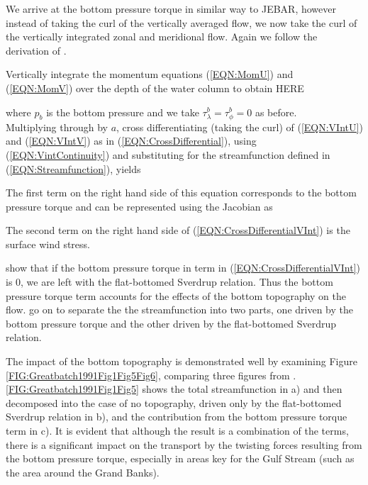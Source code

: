\documentclass[..\EOYR.tex]{subfiles}
\begin{document}
We arrive at the bottom pressure torque in similar way to JEBAR, however instead of taking the curl of the vertically averaged flow, we now take the curl of the vertically integrated zonal and meridional flow.
Again we follow the derivation of \citep{Greatbatch1991}.

Vertically integrate the momentum equations (\ref{EQN:MomU}) and (\ref{EQN:MomV}) over the depth of the water column to obtain HERE


where $p_b$ is the bottom pressure and we take $\tau_\lambda^b=\tau_\phi^b=0$ as before.\\
Multiplying through by $a$, cross differentiating (taking the curl) of (\ref{EQN:VIntU}) and (\ref{EQN:VIntV}) as in (\ref{EQN:CrossDifferential}), using (\ref{EQN:VintContinuity}) and substituting for the streamfunction defined in (\ref{EQN:Streamfunction}), yields



The first term on the right hand side of this equation corresponds to the bottom pressure torque and can be represented using the Jacobian as



The second term on the right hand side of (\ref{EQN:CrossDifferentialVInt}) is the surface wind stress.

\citep{Greatbatch1991} show that if the bottom pressure torque in term in (\ref{EQN:CrossDifferentialVInt}) is 0, we are left with the flat-bottomed Sverdrup relation. Thus the bottom pressure torque term accounts for the effects of the bottom topography on the flow. \citep{Greatbatch1991} go on to separate the the streamfunction into two parts, one driven by the bottom pressure torque and the other driven by the flat-bottomed Sverdrup relation.
\par The impact of the bottom topography is demonstrated well by examining Figure \ref{FIG:Greatbatch1991Fig1Fig5Fig6}, comparing three figures from \citep{Greatbatch1991}. \ref{FIG:Greatbatch1991Fig1Fig5} shows the total streamfunction in a) and then decomposed into the case of no topography, driven only by the flat-bottomed Sverdrup relation in b), and the contribution from the bottom pressure torque term in c). It is evident that although the result is a combination of the terms, there is a significant impact on the transport by the twisting forces resulting from the bottom pressure torque, especially in areas key for the Gulf Stream (such as the area around the Grand Banks).
\end{document}
